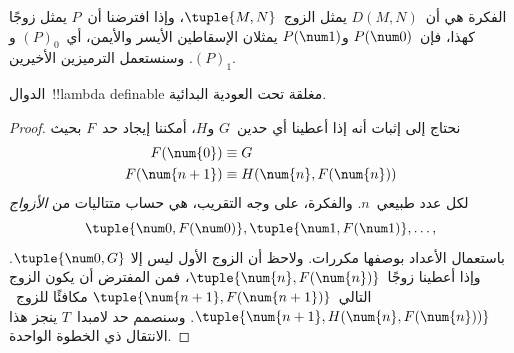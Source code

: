 \documentclass[../../../include/open-logic-section]{subfiles}
\begin{document}
الفكرة هي أن~$D(M,N)$ يمثل الزوج~$\tuple{M, N}$، وإذا افترضنا أن~$P$
يمثل زوجًا كهذا، فإن~$P(\num 0)$ و$P(\num 1)$ يمثلان الإسقاطين الأيسر
والأيمن، أي~$(P)_0$ و$(P)_1$. وسنستعمل الترميزين الأخيرين.

\begin{lem}
الدوال~!!{lambda definable} مغلقة تحت العودية البدائية.
\end{lem}

\begin{proof}
نحتاج إلى إثبات أنه إذا أعطينا أي حدين~$G$ و$H$، أمكننا إيجاد حد~$F$
بحيث
\begin{align*}
F(\num{0}) & \equiv G \\
F(\num{n+1}) & \equiv H(\num{n}, F(\num{n}))
\end{align*}
لكل عدد طبيعي~$n$. والفكرة، على وجه التقريب، هي حساب متتاليات من
\emph{الأزواج}
\[
\tuple{\num 0, F(\num 0)}, \tuple{\num 1, F(\num 1)}, \dots,
\]
باستعمال الأعداد بوصفها مكررات. ولاحظ أن الزوج الأول ليس إلا
$\tuple{\num 0, G}$. وإذا أعطينا زوجًا~$\tuple{\num{n}, F(\num{n})}$،
فمن المفترض أن يكون الزوج التالي~$\tuple{\num{n+1}, F(\num{n+1})}$
مكافئًا للزوج~$\tuple{\num{n+1}, H(\num{n}, F(\num{n}))}$. وسنصمم حد
لامبدا~$T$ ينجز هذا الانتقال ذي الخطوة الواحدة.


\end{proof}
\end{document}
